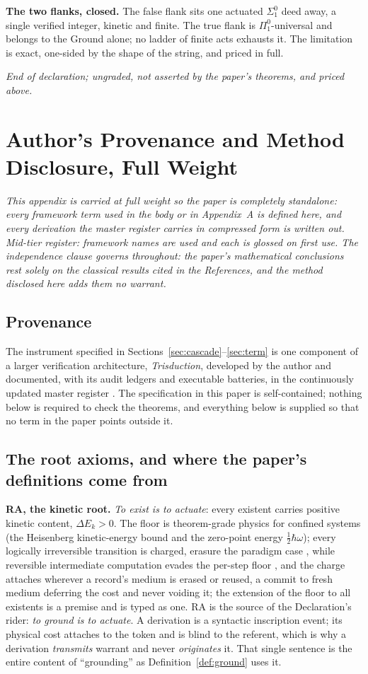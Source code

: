\documentclass[twocolumn,10pt]{article}
\theoremstyle{plain}
\theoremstyle{definition}
\begin{document}
\noindent\textbf{The two flanks, closed.} The false flank sits one actuated $\Sigma^0_1$ deed away, a single verified integer, kinetic and finite. The true flank is $\Pi^0_1$-universal and belongs to the Ground alone; no ladder of finite acts exhausts it. The limitation is exact, one-sided by the shape of the string, and priced in full.

\medskip
\noindent\emph{End of declaration; ungraded, not asserted by the paper's theorems, and priced above.}

\section{Author's Provenance and Method Disclosure, Full Weight}\label{app:disclosure}
\noindent\emph{This appendix is carried at full weight so the paper is completely standalone: every framework term used in the body or in Appendix~A is defined here, and every derivation the master register carries in compressed form is written out. Mid-tier register: framework names are used and each is glossed on first use. The independence clause governs throughout: the paper's mathematical conclusions rest solely on the classical results cited in the References, and the method disclosed here adds them no warrant.}

\subsection{Provenance}
The instrument specified in Sections~\ref{sec:cascade}--\ref{sec:term} is one component of a larger verification architecture, \emph{Trisduction}, developed by the author and documented, with its audit ledgers and executable batteries, in the continuously updated master register \cite{Islam2026}. The specification in this paper is self-contained; nothing below is required to check the theorems, and everything below is supplied so that no term in the paper points outside it.

\subsection{The root axioms, and where the paper's definitions come from}
\textbf{RA, the kinetic root.} \emph{To exist is to actuate}: every existent carries positive kinetic content, $\Delta E_k>0$. The floor is theorem-grade physics for confined systems (the Heisenberg kinetic-energy bound and the zero-point energy $\tfrac12\hbar\omega$); every logically irreversible transition is charged, erasure the paradigm case \cite{Landauer1961}, while reversible intermediate computation evades the per-step floor \cite{Bennett1973}, and the charge attaches wherever a record's medium is erased or reused, a commit to fresh medium deferring the cost and never voiding it; the extension of the floor to all existents is a premise and is typed as one. RA is the source of the Declaration's rider: \emph{to ground is to actuate}. A derivation is a syntactic inscription event; its physical cost attaches to the token and is blind to the referent, which is why a derivation \emph{transmits} warrant and never \emph{originates} it. That single sentence is the entire content of ``grounding'' as Definition~\ref{def:ground} uses it.
\end{document}
